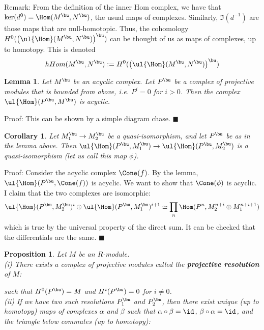 \documentclass[10 pt]{article}
\newtheorem{cor}{Corollary}[section]
\newtheorem{lem}{Lemma}[section]
\newtheorem{prop}{Proposition}[section]
\newcommand\blem{\begin{lem}}
\newcommand\bprop{\begin{prop}}
\newcommand\bcor{\begin{cor}}
\newcommand\elem{\end{lem}}
\newcommand\ecor{\end{cor}}
\newcommand\eprop{\end{prop}}
\begin{document}
Remark:  From the definition of the inner Hom complex, we have that $\ker(d^0)=\Hom(M^\bu,N^\bu)$, the usual maps of complexes.  Similarly, $\Im(d^{-1})$ are those maps that are null-homotopic.  Thus, the cohomology $H^0(\left(\ul{\Hom}(M^\bu,N^\bu)\right)^\bu)$ can be thought of us as maps of complexes, up to homotopy.  This is denoted
$$hHom(M^\bu,N^\bu):=H^0(\left(\ul{\Hom}(M^\bu,N^\bu)\right)^\bu)$$

\blem Let $M^\bu$ be an acyclic complex.  Let $P^\bu$ be a complex of projective modules that is bounded from above, i.e. $P^i=0$ for $i>0$.  Then the complex $\ul{\Hom}(P^\bu,M^\bu)$ is acyclic.  \elem

Proof: This can be shown by a simple diagram chase. $\blacksquare$

\bcor Let $M_1^\bu\rightarrow M_2^\bu$ be a quasi-isomorphism, and let $P^\bu$ be as in the lemma above.  Then $\ul{\Hom}(P^\bu,M_1^\bu)\rightarrow \ul{\Hom}(P^\bu,M_2^\bu)$ is a quasi-isomorphism (let us call this map $\phi$). \ecor

Proof: Consider the acyclic complex $\Cone(f)$.  By the lemma, $\ul{\Hom}(P^\bu,\Cone(f))$ is acyclic.  We want to show that $\Cone(\phi)$ is acyclic.  I claim that the two complexes are isomorphic:
$$\ul{\Hom}(P^\bu,M_2^\bu)^i\oplus \ul{\Hom}(P^\bu,M_1^\bu)^{i+1}\simeq \prod_n \Hom(P^n,M_2^{n+i}\oplus M_1^{n+i+1})$$
which is true by the universal property of the direct sum.  It can be checked that the differentials are the same. $\blacksquare$

\bprop Let $M$ be an $R$-module.\\
(i)  There exists a complex of projective modules called the {\bf projective resolution} of $M$:\\

such that $H^0(P^\bu)=M$ and $H^i(P^\bu)=0$ for $i\neq 0$.\\

(ii)  If we have two such resolutions $P_1^\bu$ and $P_2^\bu$, then there exist unique (up to homotopy) maps of complexes $\alpha$ and $\beta$ such that $\alpha\circ\beta=\id$, $\beta\circ \alpha=\id$, and the triangle below commutes (up to homotopy):\\
\eprop
\end{document}
